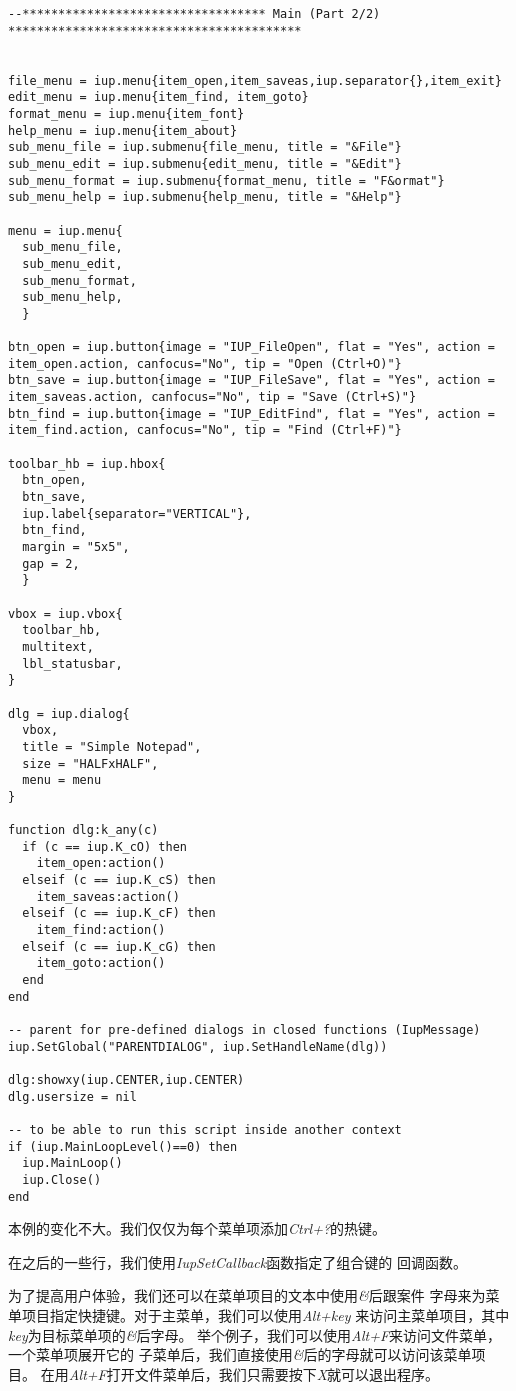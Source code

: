\documentclass{ctexart}
\begin{document}
\begin{lstlisting}
--********************************** Main (Part 2/2) *****************************************


file_menu = iup.menu{item_open,item_saveas,iup.separator{},item_exit}
edit_menu = iup.menu{item_find, item_goto}
format_menu = iup.menu{item_font}
help_menu = iup.menu{item_about}
sub_menu_file = iup.submenu{file_menu, title = "&File"}
sub_menu_edit = iup.submenu{edit_menu, title = "&Edit"}
sub_menu_format = iup.submenu{format_menu, title = "F&ormat"}
sub_menu_help = iup.submenu{help_menu, title = "&Help"}

menu = iup.menu{
  sub_menu_file, 
  sub_menu_edit, 
  sub_menu_format, 
  sub_menu_help,
  }

btn_open = iup.button{image = "IUP_FileOpen", flat = "Yes", action = item_open.action, canfocus="No", tip = "Open (Ctrl+O)"}
btn_save = iup.button{image = "IUP_FileSave", flat = "Yes", action = item_saveas.action, canfocus="No", tip = "Save (Ctrl+S)"}
btn_find = iup.button{image = "IUP_EditFind", flat = "Yes", action = item_find.action, canfocus="No", tip = "Find (Ctrl+F)"}

toolbar_hb = iup.hbox{
  btn_open,
  btn_save,
  iup.label{separator="VERTICAL"},
  btn_find,
  margin = "5x5",
  gap = 2,
  }

vbox = iup.vbox{
  toolbar_hb,
  multitext,
  lbl_statusbar,
}

dlg = iup.dialog{
  vbox,
  title = "Simple Notepad",
  size = "HALFxHALF",
  menu = menu
}

function dlg:k_any(c)
  if (c == iup.K_cO) then
    item_open:action()
  elseif (c == iup.K_cS) then
    item_saveas:action()
  elseif (c == iup.K_cF) then
    item_find:action()
  elseif (c == iup.K_cG) then
    item_goto:action()
  end
end

-- parent for pre-defined dialogs in closed functions (IupMessage)
iup.SetGlobal("PARENTDIALOG", iup.SetHandleName(dlg))

dlg:showxy(iup.CENTER,iup.CENTER)
dlg.usersize = nil

-- to be able to run this script inside another context
if (iup.MainLoopLevel()==0) then
  iup.MainLoop()
  iup.Close()
end
\end{lstlisting}


本例的变化不大。我们仅仅为每个菜单项添加\emph{Ctrl+?}的热键。

在之后的一些行，我们使用\emph{IupSetCallback}函数指定了组合键的
回调函数。

为了提高用户体验，我们还可以在菜单项目的文本中使用\emph{\&}后跟案件
字母来为菜单项目指定快捷键。对于主菜单，我们可以使用\emph{Alt+key}
来访问主菜单项目，其中\emph{key}为目标菜单项的\emph{\&}后字母。
举个例子，我们可以使用\emph{Alt+F}来访问文件菜单，一个菜单项展开它的
子菜单后，我们直接使用\emph{\&}后的字母就可以访问该菜单项目。
在用\emph{Alt+F}打开文件菜单后，我们只需要按下\emph{X}就可以退出程序。
\end{document}

